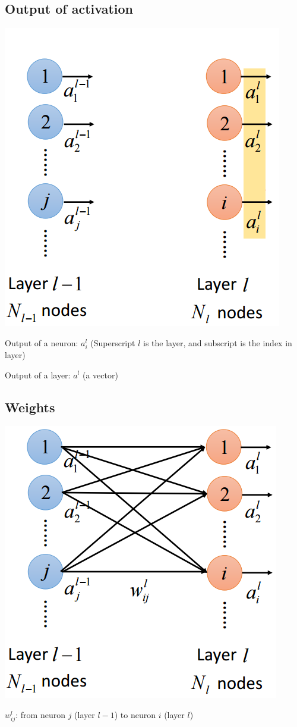 \documentclass{article}
\begin{document}
\subsection{Output of activation}
\begin{center}
\includegraphics[scale=0.3]{activation_output}
\end{center}
Output of a neuron: $a^l_i$ (Superscript $l$ is the layer, and subscript is the index in layer)

Output of a layer: $a^l$ (a vector)

\subsection{Weights}
\begin{center}
\includegraphics[scale=0.4]{weights}
\end{center}
$w^l_{ij}$: from neuron $j$ (layer $l-1$) to neuron $i$ (layer $l$)
\end{document}
